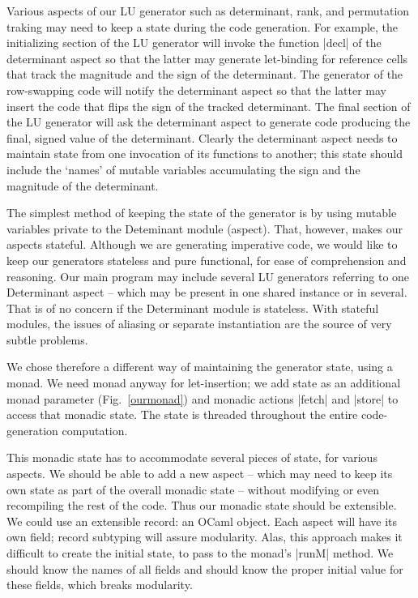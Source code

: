 \documentclass[draft]{elsart}
\begin{document}
Various aspects of our LU generator such as determinant, rank, 
and permutation traking may need to keep a state during
the code generation. For example, the initializing section of the LU
generator will invoke the function |decl| of the determinant aspect so that the
latter may generate let-binding for reference cells that track the
magnitude and the sign of the determinant. The generator of the
row-swapping code will notify the determinant aspect so that the
latter may insert the code that flips the sign of the tracked
determinant. The final section of the LU generator will ask the
determinant aspect to generate code producing the final, signed value
of the determinant. Clearly the determinant aspect needs to maintain
state from one invocation of its functions to another; this state should
include the `names' of mutable variables accumulating the sign and the
magnitude of the determinant.

The simplest method of keeping the state of the generator is by using
mutable variables private to the Deteminant module (aspect). That,
however, makes our aspects stateful. Although we are generating
imperative code, we would like to keep our generators stateless and
pure functional, for ease of comprehension and reasoning.  Our main
program may include several LU generators referring to one Determinant
aspect -- which may be present in one shared instance or in
several. That is of no concern if the Determinant module is
stateless. With stateful modules, the issues of aliasing or separate
instantiation are the source of very subtle problems.


We chose therefore a different way of maintaining the generator state,
using a monad. We need monad anyway for let-insertion; we add state as
an additional monad parameter (Fig.~\ref{ourmonad}) and monadic
actions |fetch| and |store| to access that monadic state. The state is
threaded throughout the entire code-generation computation. 

This monadic state has to accommodate several pieces of state, for
various aspects. We should be able to add a new aspect -- which may need
to keep its own state as part of the overall monadic state -- without
modifying or even recompiling the rest of the code. Thus our monadic
state should be extensible. We could use an extensible
record: an OCaml object. Each aspect will have its own field; record
subtyping will assure modularity. Alas, this approach makes it
difficult to create the initial state, to pass to the monad's |runM|
method. We should know the names of all fields and should know the
proper initial value for these fields, which breaks modularity.
\end{document}

